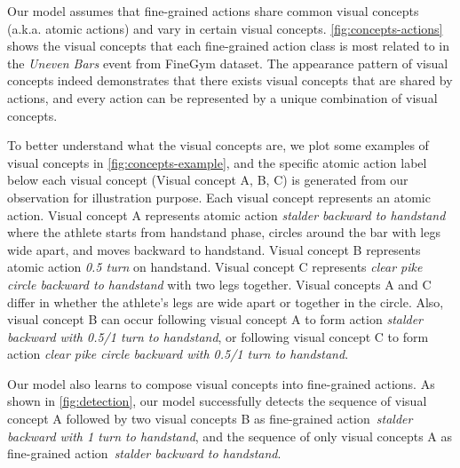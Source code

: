 Our model assumes that fine-grained actions share common visual concepts (a.k.a. atomic actions) and vary in certain visual concepts. \cref{fig:concepts-actions} shows the visual concepts that each fine-grained action class is most related to in the \textit{Uneven Bars} event from FineGym dataset. The appearance pattern of visual concepts indeed demonstrates that there exists visual concepts that are shared by actions, and every action can be represented by a unique combination of visual concepts.






To better understand what the visual concepts are, we plot some examples of visual concepts in \cref{fig:concepts-example}, and the specific atomic action label below each visual concept (Visual concept A, B, C) is generated from our observation for illustration purpose. Each visual concept represents an atomic action. Visual concept A represents atomic action \textit{stalder backward to handstand} where the athlete starts from handstand phase, circles around the bar with legs wide apart, and moves backward to handstand. Visual concept B represents atomic action \textit{0.5 turn} on handstand. Visual concept C represents \textit{clear pike circle backward to handstand} with two legs together. Visual concepts A and C differ in whether the athlete's legs are wide apart or together in the circle.
Also, visual concept B can occur following visual concept A to form action \textit{stalder backward with 0.5/1 turn to handstand}, or following visual concept C to form action \textit{clear pike circle backward with 0.5/1 turn to handstand}.





Our model also learns to compose visual concepts into fine-grained actions. As shown in \cref{fig:detection}, our model successfully detects the sequence of visual concept A followed by two visual concepts B as fine-grained action~\textit{stalder backward with 1 turn to handstand}, and the sequence of only visual concepts A as fine-grained action~\textit{stalder backward to handstand}.




